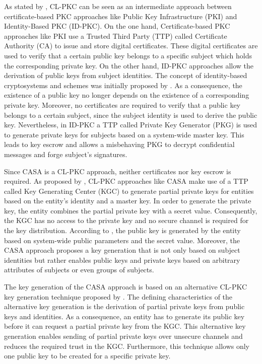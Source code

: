 As stated by \citeauthor{AlRiyami2003} \cite{AlRiyami2003}, CL-PKC can be seen as an intermediate approach between certificate-based PKC approaches like Public Key Infrastructure (PKI) and Identity-Based PKC (ID-PKC).
On the one hand, Certificate-based PKC approaches like PKI use a Trusted Third Party (TTP) called Certificate Authority (CA) to issue and store digital certificates.
These digital certificates are used to verify that a certain public key belongs to a specific subject which holds the corresponding private key.
On the other hand, ID-PKC approaches allow the derivation of public keys from subject identities.
The concept of identity-based cryptosystems and schemes was initially proposed by \citeauthor{Shamir1985} \cite{Shamir1985}.
As a consequence, the existence of a public key no longer depends on the existence of a corresponding private key.
Moreover, no certificates are required to verify that a public key belongs to a certain subject, since the subject identity is used to derive the public key.
Nevertheless, in ID-PKC a TTP called Private Key Generator (PKG) is used to generate private keys for subjects based on a system-wide master key.
This leads to key escrow and allows a misbehaving PKG to decrypt confidential messages and forge subject's signatures.

Since CASA is a CL-PKC approach, neither certificates nor key escrow is required.
As proposed by \citeauthor{AlRiyami2003} \cite{AlRiyami2003}, CL-PKC approaches like CASA make use of a TTP called Key Generating Center (KGC) to generate partial private keys for entities based on the entity's identity and a master key.
In order to generate the private key, the entity combines the partial private key with a secret value.
Consequently, the KGC has no access to the private key and no secure channel is required for the key distribution.
According to \citeauthor{AlRiyami2003}, the public key is generated by the entity based on system-wide public parameters and the secret value.
Moreover, the CASA approach proposes a key generation that is not only based on subject identities but rather enables public keys and private keys based on arbitrary attributes of subjects or even groups of subjects.

The key generation of the CASA approach is based on an alternative CL-PKC key generation technique proposed by \citeauthor{AlRiyami2003}.
The defining characteristics of the alternative key generation is the derivation of partial private keys from public keys and identities.
As a consequence, an entity has to generate its public key before it can request a partial private key from the KGC.
This alternative key generation enables sending of partial private keys over unsecure channels and reduces the required trust in the KGC.
Furthermore, this technique allows only one public key to be created for a specific private key.

